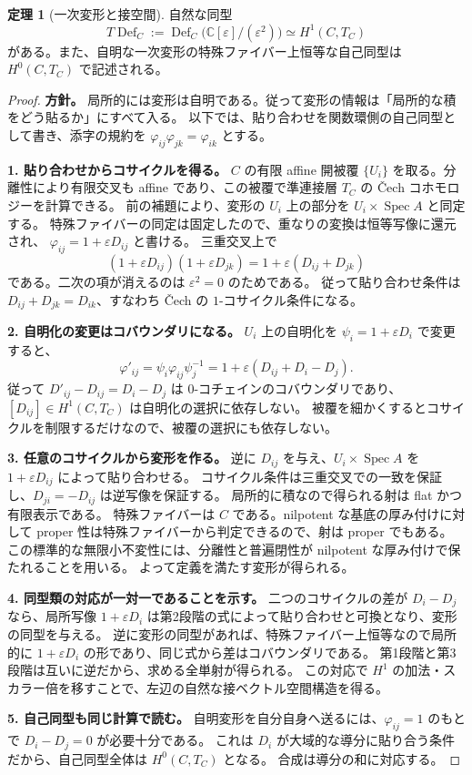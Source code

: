 \documentclass[dvipdfmx,a4paper,11pt]{article}
\theoremstyle{definition}
\newtheorem{thm}{定理}[section]
\newcommand{\C}{\mathbb C}\newcommand{\R}{\mathbb R}\newcommand{\Z}{\mathbb Z}\newcommand{\Q}{\mathbb Q}
\DeclareMathOperator{\Spec}{Spec}\DeclareMathOperator{\Proj}{Proj}\DeclareMathOperator{\GL}{GL}
\newcommand{\Def}{\operatorname{Def}}
\newcommand{\eps}{\varepsilon}
\begin{document}
\begin{thm}[一次変形と接空間]\label{thm:tangent}
自然な同型
\[
T\Def_C:=\Def_C\bigl(\C[\eps]/(\eps^2)\bigr)\simeq H^1(C,T_C)
\]
がある。また、自明な一次変形の特殊ファイバー上恒等な自己同型は $H^0(C,T_C)$ で記述される。
\end{thm}
\begin{proof}
\textbf{方針。} 局所的には変形は自明である。従って変形の情報は「局所的な積をどう貼るか」にすべて入る。
以下では、貼り合わせを関数環側の自己同型として書き、添字の規約を $\varphi_{ij}\varphi_{jk}=\varphi_{ik}$ とする。

\textbf{1. 貼り合わせからコサイクルを得る。}
$C$ の有限 affine 開被覆 $\{U_i\}$ を取る。分離性により有限交叉も affine であり、この被覆で準連接層 $T_C$ の Čech コホモロジーを計算できる。
前の補題により、変形の $U_i$ 上の部分を $U_i\times\Spec A$ と同定する。
特殊ファイバーの同定は固定したので、重なりの変換は恒等写像に還元され、
$\varphi_{ij}=1+\eps D_{ij}$ と書ける。
三重交叉上で
\[
(1+\eps D_{ij})(1+\eps D_{jk})
=1+\eps(D_{ij}+D_{jk})
\]
である。二次の項が消えるのは $\eps^2=0$ のためである。
従って貼り合わせ条件は $D_{ij}+D_{jk}=D_{ik}$、すなわち Čech の $1$-コサイクル条件になる。

\textbf{2. 自明化の変更はコバウンダリになる。}
$U_i$ 上の自明化を $\psi_i=1+\eps D_i$ で変更すると、
\[
\varphi'_{ij}=\psi_i\varphi_{ij}\psi_j^{-1}
=1+\eps(D_{ij}+D_i-D_j).
\]
従って $D'_{ij}-D_{ij}=D_i-D_j$ は $0$-コチェインのコバウンダリであり、
$[D_{ij}]\in H^1(C,T_C)$ は自明化の選択に依存しない。
被覆を細かくするとコサイクルを制限するだけなので、被覆の選択にも依存しない。

\textbf{3. 任意のコサイクルから変形を作る。}
逆に $D_{ij}$ を与え、$U_i\times\Spec A$ を $1+\eps D_{ij}$ によって貼り合わせる。
コサイクル条件は三重交叉での一致を保証し、$D_{ji}=-D_{ij}$ は逆写像を保証する。
局所的に積なので得られる射は flat かつ有限表示である。
特殊ファイバーは $C$ である。nilpotent な基底の厚み付けに対して proper 性は特殊ファイバーから判定できるので、射は proper でもある。
この標準的な無限小不変性には、分離性と普遍閉性が nilpotent な厚み付けで保たれることを用いる。
よって定義を満たす変形が得られる。

\textbf{4. 同型類の対応が一対一であることを示す。}
二つのコサイクルの差が $D_i-D_j$ なら、局所写像 $1+\eps D_i$ は第2段階の式によって貼り合わせと可換となり、変形の同型を与える。
逆に変形の同型があれば、特殊ファイバー上恒等なので局所的に $1+\eps D_i$ の形であり、同じ式から差はコバウンダリである。
第1段階と第3段階は互いに逆だから、求める全単射が得られる。
この対応で $H^1$ の加法・スカラー倍を移すことで、左辺の自然な接ベクトル空間構造を得る。

\textbf{5. 自己同型も同じ計算で読む。}
自明変形を自分自身へ送るには、$\varphi_{ij}=1$ のもとで $D_i-D_j=0$ が必要十分である。
これは $D_i$ が大域的な導分に貼り合う条件だから、自己同型全体は $H^0(C,T_C)$ となる。
合成は導分の和に対応する。
\end{proof}
\end{document}
